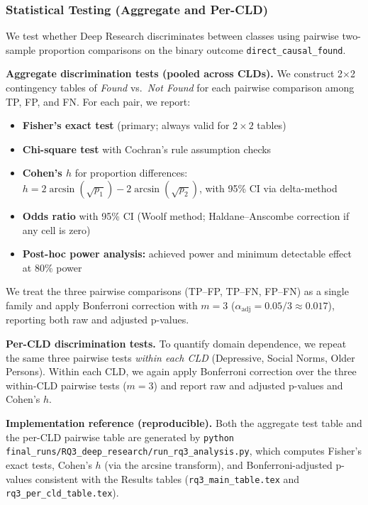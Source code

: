 \subsubsection{Statistical Testing (Aggregate and Per-CLD)}

We test whether Deep Research discriminates between classes using pairwise two-sample proportion comparisons on the binary outcome \texttt{direct\_causal\_found}.

\textbf{Aggregate discrimination tests (pooled across CLDs).} We construct 2$\times$2 contingency tables of \textit{Found} vs.\ \textit{Not Found} for each pairwise comparison among TP, FP, and FN. For each pair, we report:
\begin{itemize}[noitemsep]
    \item \textbf{Fisher's exact test} (primary; always valid for $2\times 2$ tables)
    \item \textbf{Chi-square test} with Cochran's rule assumption checks
    \item \textbf{Cohen's $h$} for proportion differences: $h = 2\arcsin(\sqrt{p_1}) - 2\arcsin(\sqrt{p_2})$, with 95\% CI via delta-method
    \item \textbf{Odds ratio} with 95\% CI (Woolf method; Haldane--Anscombe correction if any cell is zero)
    \item \textbf{Post-hoc power analysis:} achieved power and minimum detectable effect at 80\% power
\end{itemize}
We treat the three pairwise comparisons (TP--FP, TP--FN, FP--FN) as a single family and apply Bonferroni correction with $m=3$ ($\alpha_{\text{adj}}=0.05/3 \approx 0.017$), reporting both raw and adjusted p-values.

\textbf{Per-CLD discrimination tests.} To quantify domain dependence, we repeat the same three pairwise tests \textit{within each CLD} (Depressive, Social Norms, Older Persons). Within each CLD, we again apply Bonferroni correction over the three within-CLD pairwise tests ($m=3$) and report raw and adjusted p-values and Cohen's $h$.

\textbf{Implementation reference (reproducible).} Both the aggregate test table and the per-CLD pairwise table are generated by \texttt{python final\_runs/RQ3\_deep\_research/run\_rq3\_analysis.py}, which computes Fisher's exact tests, Cohen's $h$ (via the arcsine transform), and Bonferroni-adjusted p-values consistent with the Results tables (\texttt{rq3\_main\_table.tex} and \texttt{rq3\_per\_cld\_table.tex}).


